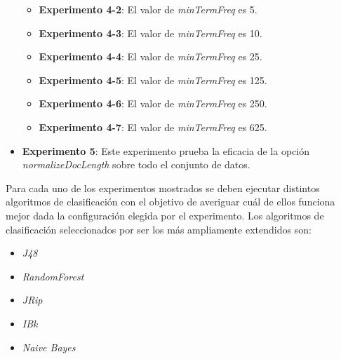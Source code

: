 \documentclass[12pt,a4paper, xcolor=table]{article}
\begin{document}
\begin{itemize}
\begin{itemize}
            \item \textbf{Experimento 4-2}: El valor de \textit{minTermFreq} es 5.
            \item \textbf{Experimento 4-3}: El valor de \textit{minTermFreq} es 10.
            \item \textbf{Experimento 4-4}: El valor de \textit{minTermFreq} es 25.
            \item \textbf{Experimento 4-5}: El valor de \textit{minTermFreq} es 125.
            \item \textbf{Experimento 4-6}: El valor de \textit{minTermFreq} es 250.
            \item \textbf{Experimento 4-7}: El valor de \textit{minTermFreq} es 625.
          \end{itemize}
          \item \textbf{Experimento 5}: Este experimento prueba la eficacia de la opción \textit{normalizeDocLength} sobre todo el conjunto de datos.

        \end{itemize}

        Para cada uno de los experimentos mostrados se deben ejecutar distintos algoritmos de clasificación con el objetivo de averiguar cuál de ellos funciona mejor dada la configuración elegida por el experimento. Los algoritmos de clasificación seleccionados por ser los más ampliamente extendidos son:

        \begin{itemize}
        \item \textit{J48}
        \item \textit{RandomForest}
        \item \textit{JRip}
        \item \textit{IBk}
        \item \textit{Naive Bayes}
        \end{itemize}
\end{document}
